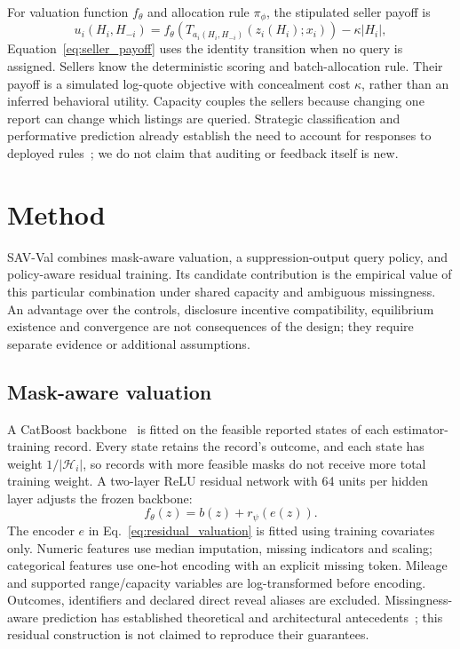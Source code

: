 For valuation function $f_\theta$ and allocation rule $\pi_\phi$, the
stipulated seller payoff is
\begin{equation}
u_i(H_i,H_{-i})=
f_\theta\!\left(T_{a_i(H_i,H_{-i})}(z_i(H_i);x_i)\right)
-\kappa|H_i|,
\label{eq:seller_payoff}
\end{equation}
Equation~\eqref{eq:seller_payoff} uses the identity transition when no query
is assigned. Sellers know the
deterministic scoring and batch-allocation rule. Their payoff is a simulated
log-quote objective with concealment cost $\kappa$, rather than an inferred
behavioral utility. Capacity couples the sellers because changing one report
can change which listings are queried. Strategic classification and
performative prediction already establish the need to account for responses
to deployed rules~\cite{hardt2016strategic,perdomo2020performative}; we do not
claim that auditing or feedback itself is new.

\section{Method}
SAV-Val combines mask-aware valuation, a suppression-output query policy,
and policy-aware residual training. Its candidate contribution is the
empirical value of this particular combination under shared capacity and
ambiguous missingness. An advantage over the controls, disclosure incentive compatibility,
equilibrium existence and convergence are not consequences of the design;
they require separate evidence or additional assumptions.

\subsection{Mask-aware valuation}
A CatBoost backbone~\cite{prokhorenkova2018catboost} is fitted on the feasible
reported states of each estimator-training record. Every state retains the
record's outcome, and each state has weight $1/|\mathcal H_i|$, so records with
more feasible masks do not receive more total training weight. A two-layer
ReLU residual network with 64 units per hidden layer adjusts the frozen
backbone:
\begin{equation}
f_\theta(z)=b(z)+r_\psi(e(z)).
\label{eq:residual_valuation}
\end{equation}
The encoder $e$ in Eq.~\eqref{eq:residual_valuation} is fitted using training
covariates only. Numeric features use
median imputation, missing indicators and scaling; categorical features use
one-hot encoding with an explicit missing token. Mileage and supported
range/capacity variables are log-transformed before encoding. Outcomes,
identifiers and declared direct reveal aliases are excluded. Missingness-aware
prediction has established theoretical and architectural
antecedents~\cite{lemorvan2020neumiss,lemorvan2021imputation}; this residual
construction is not claimed to reproduce their guarantees.

